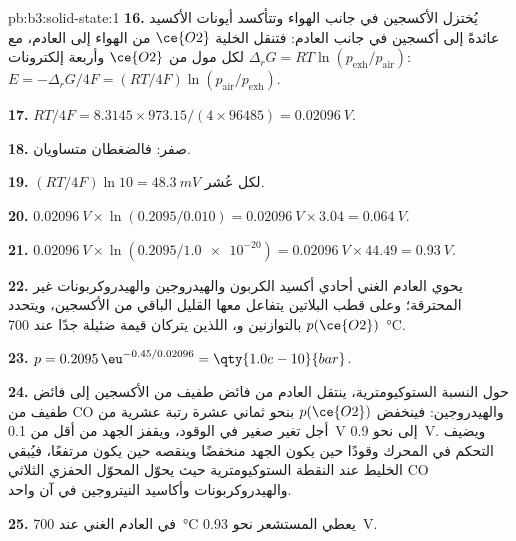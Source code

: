 \begin{solution}{pb:b3:solid-state:1}
\textbf{16.} يُختزل الأكسجين في جانب الهواء وتتأكسد أيونات الأكسيد عائدةً
إلى أكسجين في جانب العادم: فتنقل الخلية $\ce{O2}$ من الهواء إلى العادم، مع
$\Delta_rG = RT\ln(p_{\mathrm{exh}}/p_{\mathrm{air}})$ لكل مول من $\ce{O2}$ وأربعة إلكترونات: $E = -\Delta_rG/4F = (RT/4F)\ln(p_{\mathrm{air}}/p_{\mathrm{exh}})$.

\textbf{17.} $RT/4F = 8.3145 \times 973.15/(4 \times 96485) = \qty{0.02096}{V}$.

\textbf{18.} صفر: فالضغطان متساويان.

\textbf{19.} $(RT/4F)\ln 10 = \qty{48.3}{mV}$ لكل عُشر.

\textbf{20.} $\qty{0.02096}{V} \times \ln(0.2095/0.010) = \qty{0.02096}{V} \times 3.04 = \qty{0.064}{V}$.

\textbf{21.} $\qty{0.02096}{V} \times \ln(0.2095/\num{1.0e-20}) = \qty{0.02096}{V} \times 44.49 = \qty{0.93}{V}$.

\textbf{22.} يحوي العادم الغني أحادي أكسيد الكربون والهيدروجين والهيدروكربونات غير
المحترقة؛ وعلى قطب البلاتين يتفاعل معها القليل الباقي من الأكسجين،
ويتحدد $p(\ce{O2})$ بالتوازنين  و، اللذين يتركان
قيمة ضئيلة جدًا عند \qty{700}{\celsius}.

\textbf{23.} $p = 0.2095\,\eu^{-0.45/0.02096} = \qty{1.0e-10}{bar}$.

\textbf{24.} حول النسبة الستوكيومترية، ينتقل العادم من فائض طفيف
من الأكسجين إلى فائض طفيف من CO والهيدروجين: فينخفض $p(\ce{O2})$ بنحو ثماني عشرة
رتبة عشرية من أجل تغير صغير في الوقود، ويقفز الجهد من أقل من
\qty{0.1}{V} إلى نحو \qty{0.9}{V}. ويضيف التحكم في المحرك وقودًا حين يكون الجهد منخفضًا 
وينقصه حين يكون مرتفعًا، فيُبقي الخليط عند النقطة الستوكيومترية حيث يحوّل
المحوّل الحفزي الثلاثي CO والهيدروكربونات وأكاسيد النيتروجين في آن واحد.

\textbf{25.} في العادم الغني عند \qty{700}{\celsius} يعطي المستشعر نحو \qty{0.93}{V}.
\end{solution}
